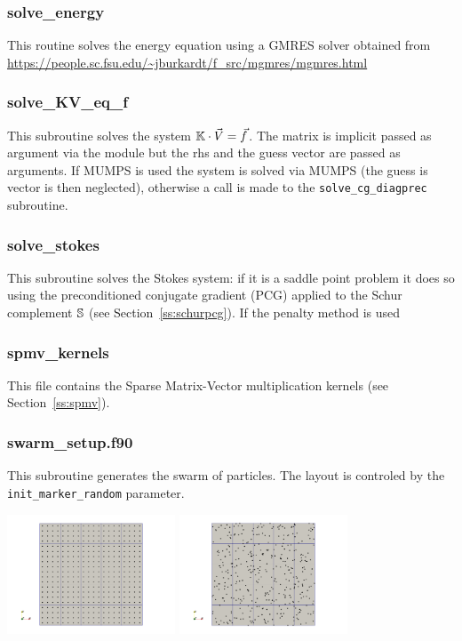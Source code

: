  \subsubsection{solve\_energy}
 This routine solves the energy equation using a GMRES solver obtained from 
 \url{https://people.sc.fsu.edu/~jburkardt/f_src/mgmres/mgmres.html} 
 \subsubsection{solve\_KV\_eq\_f}
 This subroutine solves the system ${\mathbb{K}}\cdot \vec{V} = \vec{f}$. The matrix is 
 implicit passed as argument via the module but the rhs and the guess vector are 
 passed as arguments.
 If MUMPS is used the system is solved via MUMPS (the guess is vector
 is then neglected), otherwise a call is made to  the {\tt solve\_cg\_diagprec} subroutine.
 \subsubsection{solve\_stokes}
 This subroutine solves the Stokes system: if it is a saddle point problem 
 it does so using the preconditioned conjugate gradient (PCG) applied 
 to the Schur complement ${\mathbb{S}}$  (see Section~\ref{ss:schurpcg}).
 If the penalty method is used 
 \subsubsection{spmv\_kernels}
 This file contains the Sparse Matrix-Vector multiplication kernels (see Section~\ref{ss:spmv}).
 \subsubsection{swarm\_setup.f90}
 This subroutine generates the swarm of particles. The layout is controled 
 by the {\tt init\_marker\_random} parameter.
 \begin{center}
 \includegraphics[width=5cm]{ELEFANT/images/swarm_reg} 
 \includegraphics[width=5cm]{ELEFANT/images/swarm_rand} 
 \end{center}
